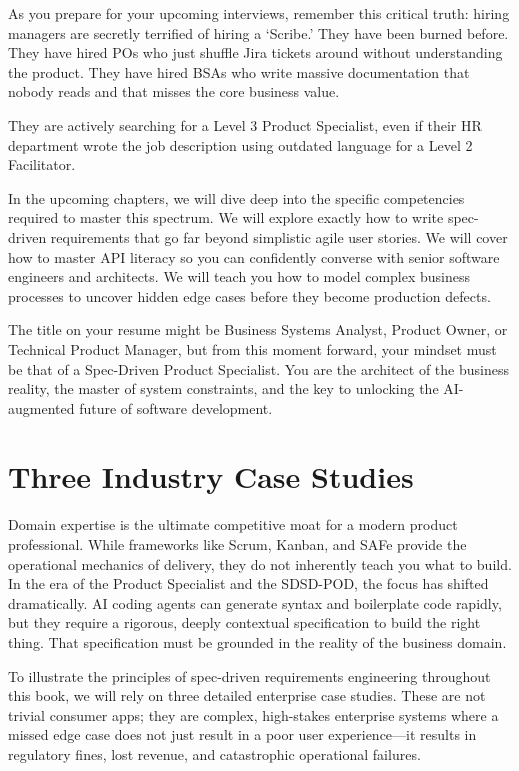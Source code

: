 \documentclass[
  11pt,
  openany,
  oneside]{book}
\begin{document}
As you prepare for your upcoming interviews, remember this critical
truth: hiring managers are secretly terrified of hiring a `Scribe.' They
have been burned before. They have hired POs who just shuffle Jira
tickets around without understanding the product. They have hired BSAs
who write massive documentation that nobody reads and that misses the
core business value.

They are actively searching for a Level 3 Product Specialist, even if
their HR department wrote the job description using outdated language
for a Level 2 Facilitator.

In the upcoming chapters, we will dive deep into the specific
competencies required to master this spectrum. We will explore exactly
how to write spec-driven requirements that go far beyond simplistic
agile user stories. We will cover how to master API literacy so you can
confidently converse with senior software engineers and architects. We
will teach you how to model complex business processes to uncover hidden
edge cases before they become production defects.

The title on your resume might be Business Systems Analyst, Product
Owner, or Technical Product Manager, but from this moment forward, your
mindset must be that of a Spec-Driven Product Specialist. You are the
architect of the business reality, the master of system constraints, and
the key to unlocking the AI-augmented future of software development.

\chapter{Three Industry Case Studies}\label{three-industry-case-studies}

Domain expertise is the ultimate competitive moat for a modern product
professional. While frameworks like Scrum, Kanban, and SAFe provide the
operational mechanics of delivery, they do not inherently teach you what
to build. In the era of the Product Specialist and the SDSD-POD, the
focus has shifted dramatically. AI coding agents can generate syntax and
boilerplate code rapidly, but they require a rigorous, deeply contextual
specification to build the right thing. That specification must be
grounded in the reality of the business domain.

To illustrate the principles of spec-driven requirements engineering
throughout this book, we will rely on three detailed enterprise case
studies. These are not trivial consumer apps; they are complex,
high-stakes enterprise systems where a missed edge case does not just
result in a poor user experience---it results in regulatory fines, lost
revenue, and catastrophic operational failures.
\end{document}
